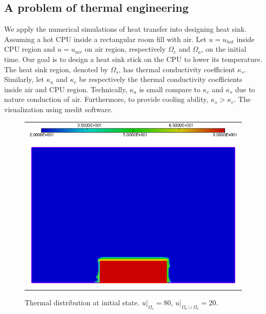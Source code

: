 \subsection{A problem of thermal engineering}
We apply the numerical simulations of heat transfer into designing heat sink. Assuming a hot CPU inside a rectangular room fill with air. Let $u=u_{hot}$ inside CPU region and $u=u_{air}$ on air region, respectively $\Omega_{c}$ and $\Omega_{a}$, on the initial time. Our goal is to design a heat sink stick on the CPU to lower its temperature. \\
The heat sink region, denoted by $\Omega_{s}$, has thermal conductivity coefficient $\kappa_s$. Similarly, let $\kappa_a$ and $\kappa_c$ be respectively the thermal conductivity coefficients inside air and CPU region. Technically, $\kappa_a$ is small compare to $\kappa_c$ and $\kappa_s$ due to nature conduction of air. Furthermore, to provide cooling ability, $\kappa_s>\kappa_c$. The visualization using medit software.\\
\begin{figure}[h!]
	\centering
	\begin{tabular}{c}
		\includegraphics[width=.8\linewidth]{figures/begin}
	\end{tabular}
	\caption{Thermal distribution at initial state. $u|_{\Omega_{c}} = 80$, $u|_{\Omega_{a}\cup\Omega_{s}}=20$.}
\end{figure}
